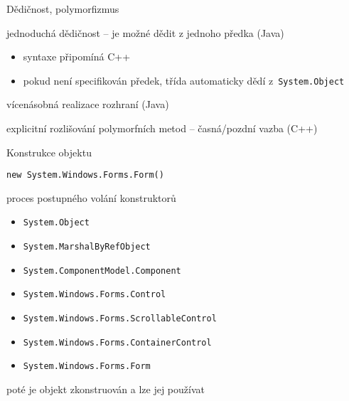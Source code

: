 


\begin{frame}[fragile]
\begin{bitemize}{Dědičnost, polymorfizmus}
\item jednoduchá dědičnost -- je možné dědit z jednoho předka (Java)
\begin{itemize}
\item syntaxe připomíná C++
\item pokud není specifikován předek, třída automaticky dědí z~\lstinline|System.Object|
\end{itemize}
\item vícenásobná realizace rozhraní (Java)
\item explicitní rozlišování polymorfních metod -- časná/pozdní vazba (C++)
\end{bitemize}
\end{frame}



\begin{frame}[fragile]
\begin{bitemize}{Konstrukce objektu}
\item \lstinline|new System.Windows.Forms.Form()|
\item proces postupného volání konstruktorů
\begin{itemize}
\item \lstinline|System.Object|
\item \lstinline|System.MarshalByRefObject|
\item \lstinline|System.ComponentModel.Component|
\item \lstinline|System.Windows.Forms.Control|
\item \lstinline|System.Windows.Forms.ScrollableControl|
\item \lstinline|System.Windows.Forms.ContainerControl|
\item \lstinline|System.Windows.Forms.Form|
\end{itemize}
\item poté je objekt zkonstruován a lze jej používat
\end{bitemize}
\end{frame}



